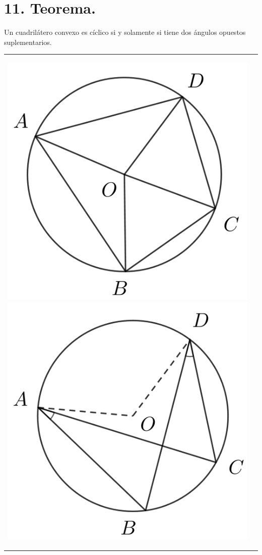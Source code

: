 \documentclass[12pt,a4paper, oneside]{book}
\begin{document}
\section{11. Teorema.}
Un cuadrilátero convexo es cíclico si y solamente si tiene dos ángulos opuestos suplementarios.\\
\begin{tabular}{p{15.9 cm} p{1cm}}
\\
\begin{center}
\includegraphics[scale=0.6]{Imagenes/ciclico.png} 
\includegraphics[scale=0.6]{Imagenes/ciclico1.png} 

\end{center}
\end{tabular}
\end{document}
